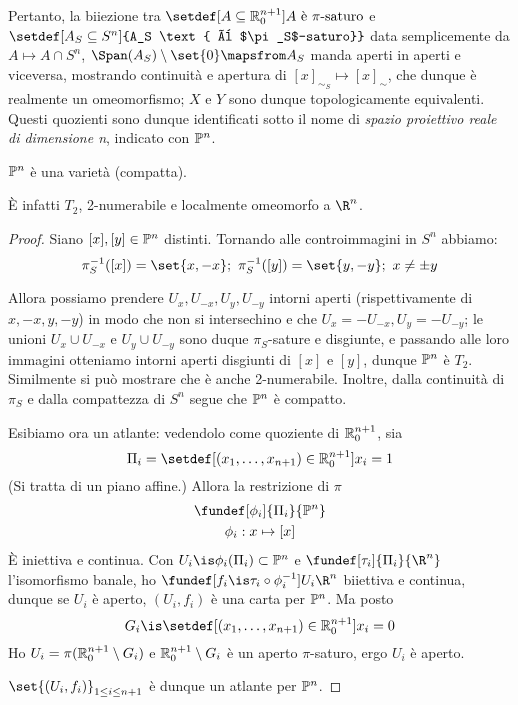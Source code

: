 Pertanto, la biiezione tra $\setdef[A \subseteq {\Ro[n+1]} ]{A \text{ è $\pi$-saturo}}$ e $\setdef[A_S\subseteq S^n]{A_S \text{ è $\pi_S$-saturo}}$ data semplicemente da $A\mapsto A\cap S^n$, $\Span(A_S)\setminus \set{0} \mapsfrom A_S$ manda aperti in aperti e viceversa, mostrando continuità e apertura di $[x]_{\sim_S}  \mapsto  [x]_\sim$, che dunque è realmente un omeomorfismo; $X$ e $Y$ sono dunque topologicamente equivalenti. Questi quozienti sono dunque identificati sotto il nome di \emph{spazio proiettivo reale di dimensione n}, indicato con $\Ps^n$.

\begin{prop} $\Ps^n$ è una varietà (compatta). \end{prop}
È infatti $T_2$, 2-numerabile e localmente omeomorfo a $\R^n$.

\begin{proof}
Siano $[x], [y] \in \Ps^n$ distinti. Tornando alle controimmagini in $S^n$ abbiamo: \[
\pi_S^{-1}([x]) = \set{x, -x}; \
\pi_S^{-1}([y]) = \set{y, -y}; \
x \neq \pm y \]

Allora possiamo prendere $U_x, U_{-x}, U_y, U_{-y}$ intorni aperti (rispettivamente di $x, -x, y, -y$) in modo che non si intersechino e che $U_x = -U_{-x}, U_y = -U_{-y}$; le unioni $U_x \cup U_{-x}$ e $U_y \cup U_{-y}$ sono duque $\pi_S$-sature e disgiunte, e passando alle loro immagini otteniamo intorni aperti disgiunti di $[x]$ e $[y]$, dunque $\Ps^n$ è $T_2$. Similmente si può mostrare che è anche 2-numerabile. Inoltre, dalla continuità di $\pi_S$ e dalla compattezza di $S^n$ segue che $\Ps^n $ è compatto.

Esibiamo ora un atlante: vedendolo come quoziente di $\Ro[n+1]$, sia \[
\Pi_i = \setdef[(x_1, \dots, x_{n+1})\in {\Ro[n+1]}]{x_i = 1} \]
(Si tratta di un piano affine.) Allora la restrizione di $\pi$
\begin{gather*}
\fundef[\phi_i]{\Pi_i}{\Ps^n} \\
\phi_i : x \mapsto [x]
\end{gather*}
È iniettiva e continua. Con $U_i \is \phi_i(\Pi_i) \subset \Ps^n$ e $\fundef[\tau_i]{\Pi_i}{\R^n}$ l'isomorfismo banale, ho $\fundef[f_i \is \tau_i \circ \phi_i^{-1}]{U_i}{\R^n}$ biiettiva e continua, dunque se $U_i$ è aperto, $(U_i, f_i)$ è una carta per $\Ps^n$. Ma posto \[
G_i \is \setdef[(x_1, \dots, x_{n+1})\in {\Ro[n+1]}]{x_i = 0} \]
Ho $U_i = \pi(\Ro[n+1] \setminus G_i)$ e $\Ro[n+1] \setminus G_i$ è un aperto $\pi$-saturo, ergo $U_i$ è aperto.

$\set{(U_i, f_i)}_{1 \leq i \leq n+1}$ è dunque un atlante per $\Ps^n$.
\end{proof}

